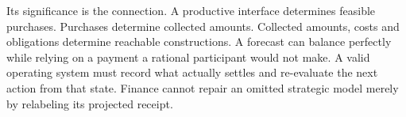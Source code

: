 Its significance is the connection. A productive interface determines feasible purchases. Purchases determine collected amounts. Collected amounts, costs and obligations determine reachable constructions. A forecast can balance perfectly while relying on a payment a rational participant would not make. A valid operating system must record what actually settles and re-evaluate the next action from that state. Finance cannot repair an omitted strategic model merely by relabeling its projected receipt.
